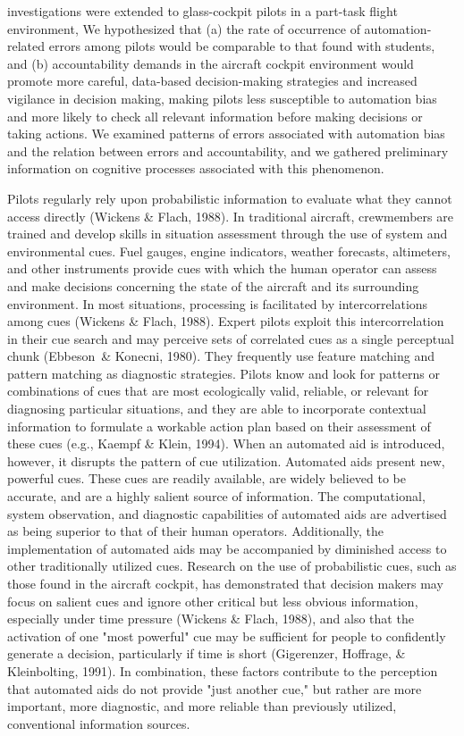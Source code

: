 \documentclass[utf8,bachelor,manualbib]{gradu3}
\begin{document}
investigations were extended to glass-cockpit pilots in a part-task flight environment,
We hypothesized that (a) the rate of occurrence of automation-related errors
among pilots would be comparable to that found with students, and (b) accountability
demands in the aircraft cockpit environment would promote more careful,
data-based decision-making strategies and increased vigilance in decision making,
making pilots less susceptible to automation bias and more likely to check all
relevant information before making decisions or taking actions. We examined
patterns of errors associated with automation bias and the relation between errors
and accountability, and we gathered preliminary information on cognitive processes
associated with this phenomenon.\citep{mosierym1998}

Pilots regularly rely upon probabilistic information to evaluate what they cannot
access directly (Wickens \& Flach, 1988). In traditional aircraft, crewmembers are
trained and develop skills in situation assessment through the use of system and
environmental cues. Fuel gauges, engine indicators, weather forecasts, altimeters,
and other instruments provide cues with which the human operator can assess and
make decisions concerning the state of the aircraft and its surrounding environment.
In most situations, processing is facilitated by intercorrelations among cues (Wickens
\& Flach, 1988). Expert pilots exploit this intercorrelation in their cue search
and may perceive sets of correlated cues as a single perceptual chunk (Ebbeson\ \&
Konecni, 1980). They frequently use feature matching and pattern matching as
diagnostic strategies. Pilots know and look for patterns or combinations of cues
that are most ecologically valid, reliable, or relevant for diagnosing particular
situations, and they are able to incorporate contextual information to formulate a
workable action plan based on their assessment of these cues (e.g., Kaempf \& Klein,
1994).
When an automated aid is introduced, however, it disrupts the pattern of cue
utilization. Automated aids present new, powerful cues. These cues are readily
available, are widely believed to be accurate, and are a highly salient source of
information. The computational, system observation, and diagnostic capabilities of
automated aids are advertised as being superior to that of their human operators.
Additionally, the implementation of automated aids may be accompanied by
diminished access to other traditionally utilized cues. Research on the use of
probabilistic cues, such as those found in the aircraft cockpit, has demonstrated that
decision makers may focus on salient cues and ignore other critical but less obvious
information, especially under time pressure (Wickens \& Flach, 1988), and also that
the activation of one "most powerful" cue may be sufficient for people to confidently
generate a decision, particularly if time is short (Gigerenzer, Hoffrage, \&
Kleinbolting, 1991). In combination, these factors contribute to the perception that
automated aids do not provide "just another cue," but rather are more important,
more diagnostic, and more reliable than previously utilized, conventional information
sources. \citep{mosierym1998}
\end{document}
